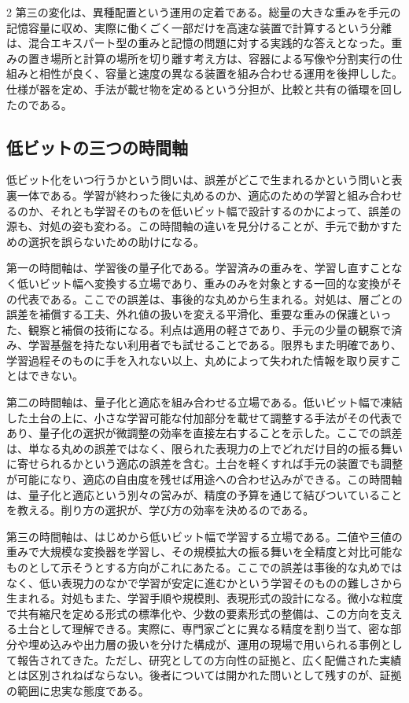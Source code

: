 \documentclass[lualatex,a4paper,10pt]{jlreq}
\begin{document}
\begin{multicols}{2}
第三の変化は、異種配置という運用の定着である。総量の大きな重みを手元の記憶容量に収め、実際に働くごく一部だけを高速な装置で計算するという分離は、混合エキスパート型の重みと記憶の問題に対する実践的な答えとなった\autocite{ktransformers}。重みの置き場所と計算の場所を切り離す考え方は、容器による写像や分割実行の仕組みと相性が良く、容量と速度の異なる装置を組み合わせる運用を後押しした。仕様が器を定め、手法が載せ物を定めるという分担が、比較と共有の循環を回したのである。

\subsection{低ビットの三つの時間軸}
低ビット化をいつ行うかという問いは、誤差がどこで生まれるかという問いと表裏一体である。学習が終わった後に丸めるのか、適応のための学習と組み合わせるのか、それとも学習そのものを低いビット幅で設計するのかによって、誤差の源も、対処の姿も変わる。この時間軸の違いを見分けることが、手元で動かすための選択を誤らないための助けになる\autocite{gptq}\autocite{qlora}\autocite{bitnet}\autocite{bitnet158}。

第一の時間軸は、学習後の量子化である。学習済みの重みを、学習し直すことなく低いビット幅へ変換する立場であり、重みのみを対象とする一回的な変換がその代表である\autocite{gptq}。ここでの誤差は、事後的な丸めから生まれる。対処は、層ごとの誤差を補償する工夫、外れ値の扱いを変える平滑化、重要な重みの保護といった、観察と補償の技術になる\autocite{smoothquant}\autocite{awq}。利点は適用の軽さであり、手元の少量の観察で済み、学習基盤を持たない利用者でも試せることである。限界もまた明確であり、学習過程そのものに手を入れない以上、丸めによって失われた情報を取り戻すことはできない。

第二の時間軸は、量子化と適応を組み合わせる立場である。低いビット幅で凍結した土台の上に、小さな学習可能な付加部分を載せて調整する手法がその代表であり、量子化の選択が微調整の効率を直接左右することを示した\autocite{qlora}。ここでの誤差は、単なる丸めの誤差ではなく、限られた表現力の上でどれだけ目的の振る舞いに寄せられるかという適応の誤差を含む。土台を軽くすれば手元の装置でも調整が可能になり、適応の自由度を残せば用途への合わせ込みができる。この時間軸は、量子化と適応という別々の営みが、精度の予算を通じて結びついていることを教える。削り方の選択が、学び方の効率を決めるのである。

第三の時間軸は、はじめから低いビット幅で学習する立場である。二値や三値の重みで大規模な変換器を学習し、その規模拡大の振る舞いを全精度と対比可能なものとして示そうとする方向がこれにあたる\autocite{bitnet}\autocite{bitnet158}。ここでの誤差は事後的な丸めではなく、低い表現力のなかで学習が安定に進むかという学習そのものの難しさから生まれる。対処もまた、学習手順や規模則、表現形式の設計になる。微小な粒度で共有縮尺を定める形式の標準化や、少数の要素形式の整備は、この方向を支える土台として理解できる\autocite{fp8formats}\autocite{mxspec}。実際に、専門家ごとに異なる精度を割り当て、密な部分や埋め込みや出力層の扱いを分けた構成が、運用の現場で用いられる事例として報告されてきた\autocite{mxfp4}。ただし、研究としての方向性の証拠と、広く配備された実績とは区別されねばならない。後者については開かれた問いとして残すのが、証拠の範囲に忠実な態度である。


\end{multicols}
\end{document}
